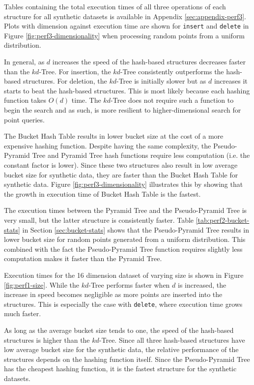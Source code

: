 Tables containing the total execution times of all three operations of each structure for all synthetic datasets is available in Appendix \ref{sec:appendix-perf3}. Plots with dimension against execution time are shown for \texttt{insert} and \texttt{delete} in Figure \ref{fig:perf3-dimensionality} when processing random points from a uniform distribution.

In general, as $d$ increases the speed of the hash-based structures decreases faster than the $kd$-Tree. For insertion, the $kd$-Tree consistently outperforms the hash-based structures. For deletion, the $kd$-Tree is initially slower but as $d$ increases it starts to beat the hash-based structures. This is most likely because each hashing function takes $O(d)$ time. The $kd$-Tree does not require such a function to begin the search and as such, is more resilient to higher-dimensional search for point queries.

The Bucket Hash Table results in lower bucket size at the cost of a more expensive hashing function. Despite having the same complexity, the Pseudo-Pyramid Tree and Pyramid Tree hash functions require less computation (i.e. the constant factor is lower). Since these two structures also result in low average bucket size for synthetic data, they are faster than the Bucket Hash Table for synthetic data. Figure \ref{fig:perf3-dimensionality} illustrates this by showing that the growth in execution time of Bucket Hash Table is the fastest. 

The execution times between the Pyramid Tree and the Pseudo-Pyramid Tree is very small, but the latter structure is consistently faster. Table \ref{tab:perf2-bucket-stats} in Section \ref{sec:bucket-stats} shows that the Pseudo-Pyramid Tree results in lower bucket size for random points generated from a uniform distribution. This combined with the fact the Pseudo-Pyramid Tree function requires slightly less computation makes it faster than the Pyramid Tree.

Execution times for the 16 dimension dataset of varying size is shown in Figure \ref{fig:perf1-size}. While the $kd$-Tree performs faster when $d$ is increased, the increase in speed becomes negligible as more points are inserted into the structures. This is especially the case with \texttt{delete}, where execution time grows much faster.

As long as the average bucket size tends to one, the speed of the hash-based structures is higher than the $kd$-Tree. Since all three hash-based structures have low average bucket size for the synthetic data, the relative performance of the structures depends on the hashing function itself. Since the Pseudo-Pyramid Tree has the cheapest hashing function, it is the fastest structure for the synthetic datasets.

